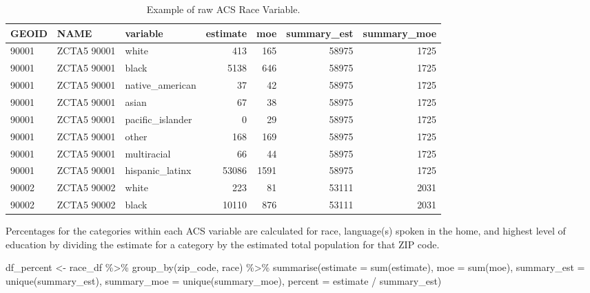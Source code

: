\documentclass[
]{book}
\newenvironment{Shaded}{\begin{snugshade}}{\end{snugshade}}
\newcommand{\AttributeTok}[1]{\textcolor[rgb]{0.77,0.63,0.00}{#1}}
\newcommand{\FunctionTok}[1]{\textcolor[rgb]{0.00,0.00,0.00}{#1}}
\newcommand{\NormalTok}[1]{#1}
\newcommand{\OtherTok}[1]{\textcolor[rgb]{0.56,0.35,0.01}{#1}}
\newcommand{\SpecialCharTok}[1]{\textcolor[rgb]{0.00,0.00,0.00}{#1}}
\begin{document}
\begin{table}

\caption{\label{tab:unnamed-chunk-19}Example of raw ACS Race Variable.}
\centering
\begin{tabular}[t]{l|l|l|r|r|r|r}
\hline
GEOID & NAME & variable & estimate & moe & summary\_est & summary\_moe\\
\hline
90001 & ZCTA5 90001 & white & 413 & 165 & 58975 & 1725\\
\hline
90001 & ZCTA5 90001 & black & 5138 & 646 & 58975 & 1725\\
\hline
90001 & ZCTA5 90001 & native\_american & 37 & 42 & 58975 & 1725\\
\hline
90001 & ZCTA5 90001 & asian & 67 & 38 & 58975 & 1725\\
\hline
90001 & ZCTA5 90001 & pacific\_islander & 0 & 29 & 58975 & 1725\\
\hline
90001 & ZCTA5 90001 & other & 168 & 169 & 58975 & 1725\\
\hline
90001 & ZCTA5 90001 & multiracial & 66 & 44 & 58975 & 1725\\
\hline
90001 & ZCTA5 90001 & hispanic\_latinx & 53086 & 1591 & 58975 & 1725\\
\hline
90002 & ZCTA5 90002 & white & 223 & 81 & 53111 & 2031\\
\hline
90002 & ZCTA5 90002 & black & 10110 & 876 & 53111 & 2031\\
\hline
\end{tabular}
\end{table}

Percentages for the categories within each ACS variable are calculated for race, language(s) spoken in the home, and highest level of education by dividing the estimate for a category by the estimated total population for that ZIP code.

\begin{Shaded}
\begin{Highlighting}[]
\NormalTok{df\_percent }\OtherTok{\textless{}{-}} 
\NormalTok{  race\_df }\SpecialCharTok{\%\textgreater{}\%} 
  \FunctionTok{group\_by}\NormalTok{(zip\_code, race) }\SpecialCharTok{\%\textgreater{}\%} 
  \FunctionTok{summarise}\NormalTok{(}\AttributeTok{estimate =} \FunctionTok{sum}\NormalTok{(estimate),}
            \AttributeTok{moe =} \FunctionTok{sum}\NormalTok{(moe),}
            \AttributeTok{summary\_est =} \FunctionTok{unique}\NormalTok{(summary\_est),}
            \AttributeTok{summary\_moe =} \FunctionTok{unique}\NormalTok{(summary\_moe),}
            \AttributeTok{percent =}\NormalTok{ estimate }\SpecialCharTok{/}\NormalTok{ summary\_est)}
\end{Highlighting}
\end{Shaded}
\end{document}
